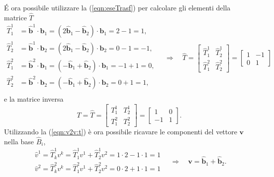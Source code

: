 \'E ora possibile utilizzare la (\ref{eqn:eseTrasf}) per calcolare gli elementi della matrice $\hat{T}$
\begin{equation}
\begin{aligned}
 \hat{T}^{1}_{1} &= \bm{\hat{b}}^1 \cdot \bm{b}_1 = 
  (2 \bm{\hat{b}}_1 - \bm{\hat{b}}_2) \cdot \bm{b}_1 = 
   2 - 1 = 1 ,  \\
 \hat{T}^{1}_{2} &= \bm{\hat{b}}^1 \cdot \bm{b}_2 = 
  (2 \bm{\hat{b}}_1 - \bm{\hat{b}}_2) \cdot \bm{b}_2 = 
   0 - 1 = -1 ,  \\
 \hat{T}^{2}_{1} &= \bm{\hat{b}}^2 \cdot \bm{b}_1 = 
  (- \bm{\hat{b}}_1 + \bm{\hat{b}}_2) \cdot \bm{b}_1 = 
   -1 + 1 = 0 ,  \\
 \hat{T}^{2}_{2} &= \bm{\hat{b}}^2 \cdot \bm{b}_2 = 
  (- \bm{\hat{b}}_1 + \bm{\hat{b}}_2) \cdot \bm{b}_2 = 
    0 + 1 = 1 ,  \\
\end{aligned}
 \quad \Rightarrow \quad
 \hat{T} = \begin{bmatrix} \hat{T}^1_1 & \hat{T}^1_2 \\ \hat{T}^2_1 & \hat{T}^2_2 \end{bmatrix}
   = \begin{bmatrix} 1 & -1 \\ 0 & 1 \end{bmatrix}
\end{equation}
 e la matrice inversa
\begin{equation}
 T = \hat{T} = \begin{bmatrix} T^1_1 & T^1_2 \\ T^2_1 & T^2_2 \end{bmatrix} =
 \begin{bmatrix} 1 & 0 \\ -1 & 1 \end{bmatrix} .
\end{equation}
Utilizzando la (\ref{eqn:v2v:t}) è ora possibile ricavare le componenti del vettore $\bm{v}$ nella base $\hat{B}_i$,
\begin{equation}
\begin{aligned}
 \hat{v}^1 = \hat{T}^1_k v^k = \hat{T}^1_1 v^1 + \hat{T}^1_2 v^2 = 
             1 \cdot 2 - 1 \cdot 1 = 1 \\
 \hat{v}^2 = \hat{T}^2_k v^k = \hat{T}^2_1 v^1 + \hat{T}^2_2 v^2 = 
             0 \cdot 2 + 1 \cdot 1 = 1 \\
\end{aligned}
\quad \Rightarrow \quad 
 \bm{v} = \bm{\hat{b}}_1 + \bm{\hat{b}}_2 .
\end{equation}
